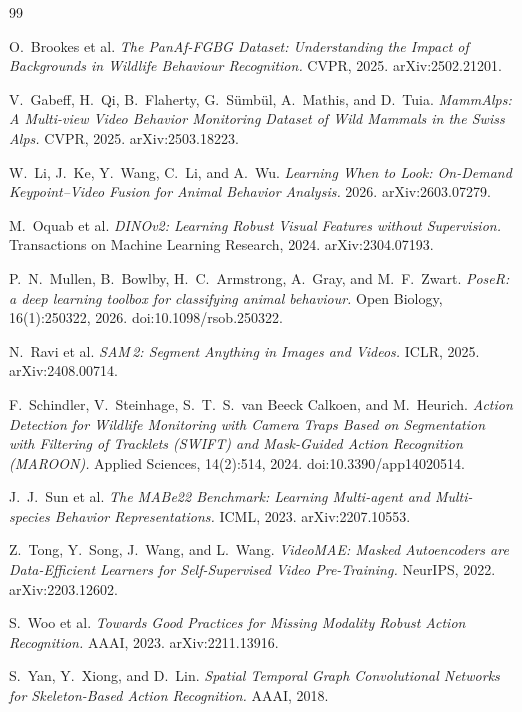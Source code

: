 \documentclass[12pt,a4paper]{report}
\begin{document}
\begin{thebibliography}{99}

 O.~Brookes et al. \emph{The PanAf-FGBG Dataset: Understanding the Impact of Backgrounds in Wildlife Behaviour Recognition.} CVPR, 2025. arXiv:2502.21201.

 V.~Gabeff, H.~Qi, B.~Flaherty, G.~S\"umb\"ul, A.~Mathis, and D.~Tuia. \emph{MammAlps: A Multi-view Video Behavior Monitoring Dataset of Wild Mammals in the Swiss Alps.} CVPR, 2025. arXiv:2503.18223.

 W.~Li, J.~Ke, Y.~Wang, C.~Li, and A.~Wu. \emph{Learning When to Look: On-Demand Keypoint--Video Fusion for Animal Behavior Analysis.} 2026. arXiv:2603.07279.

 M.~Oquab et al. \emph{DINOv2: Learning Robust Visual Features without Supervision.} Transactions on Machine Learning Research, 2024. arXiv:2304.07193.

 P.~N.~Mullen, B.~Bowlby, H.~C.~Armstrong, A.~Gray, and M.~F.~Zwart. \emph{PoseR: a deep learning toolbox for classifying animal behaviour.} Open Biology, 16(1):250322, 2026. doi:10.1098/rsob.250322.

 N.~Ravi et al. \emph{SAM\,2: Segment Anything in Images and Videos.} ICLR, 2025. arXiv:2408.00714.

 F.~Schindler, V.~Steinhage, S.~T.~S.~van Beeck Calkoen, and M.~Heurich. \emph{Action Detection for Wildlife Monitoring with Camera Traps Based on Segmentation with Filtering of Tracklets (SWIFT) and Mask-Guided Action Recognition (MAROON).} Applied Sciences, 14(2):514, 2024. doi:10.3390/app14020514.

 J.~J.~Sun et al. \emph{The MABe22 Benchmark: Learning Multi-agent and Multi-species Behavior Representations.} ICML, 2023. arXiv:2207.10553.

 Z.~Tong, Y.~Song, J.~Wang, and L.~Wang. \emph{VideoMAE: Masked Autoencoders are Data-Efficient Learners for Self-Supervised Video Pre-Training.} NeurIPS, 2022. arXiv:2203.12602.

 S.~Woo et al. \emph{Towards Good Practices for Missing Modality Robust Action Recognition.} AAAI, 2023. arXiv:2211.13916.

 S.~Yan, Y.~Xiong, and D.~Lin. \emph{Spatial Temporal Graph Convolutional Networks for Skeleton-Based Action Recognition.} AAAI, 2018.

\end{thebibliography}
\end{document}
